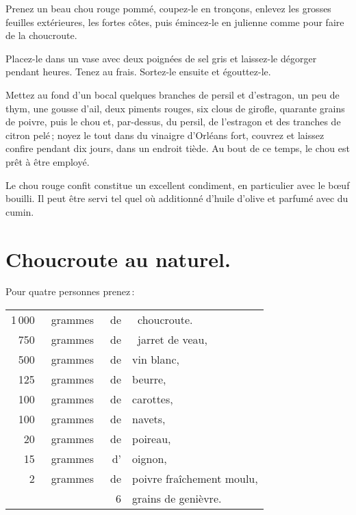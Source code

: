 Prenez un beau chou rouge pommé, coupez-le en tronçons, enlevez les grosses
feuilles extérieures, les fortes côtes, puis émincez-le en julienne comme pour
faire de la choucroute.

Placez-le dans un vase avec deux poignées de sel gris et laissez-le dégorger
pendant {\mmm} heures. Tenez au frais. Sortez-le ensuite et égouttez-le.

Mettez au fond d'un bocal quelques branches de persil et d’estragon, un peu de
thym, une gousse d'ail, deux piments rouges, six clous de girofle, quarante
grains de poivre, puis le chou et, par-dessus, du persil, de l'estragon et des
tranches de citron pelé ; noyez le tout dans du vinaigre d'Orléans fort,
couvrez et laissez confire pendant dix jours, dans un endroit tiède. Au bout de
ce temps, le chou est prêt à être employé.

\medskip

Le chou rouge confit constitue un excellent condiment, en particulier avec le
bœuf bouilli. Il peut être servi tel quel où additionné d'huile d'olive et
parfumé avec du cumin.

\label{pg0791} \hypertarget{p0791}{}
\section*{\centering Choucroute au naturel.}
{}

Pour quatre personnes prenez :

\footnotesize
\begin{longtable}{rrrp{16em}}
  1 000 & grammes & de & choucroute.                                                                      \\
    750 & grammes & de & jarret de veau,                                                                  \\
    500 & grammes & de & vin blanc,                                                                       \\
    125 & grammes & de & beurre,                                                                          \\
    100 & grammes & de & carottes,                                                                        \\
    100 & grammes & de & navets,                                                                          \\
     20 & grammes & de & poireau,                                                                         \\
     15 & grammes & d' & oignon,                                                                          \\
      2 & grammes & de & poivre fraîchement moulu,                                                        \\
        &         &  6 & grains de genièvre.                                                              \\
\end{longtable}
\normalsize


